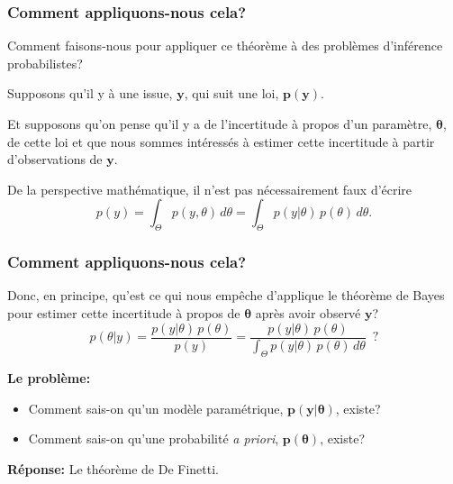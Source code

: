 \documentclass{beamer}
\begin{document}
\begin{frame}
    \frametitle{Comment appliquons-nous cela?}
    Comment faisons-nous pour appliquer ce théorème à des problèmes 
    d'inférence probabilistes?

    \pause

    \vfill

    Supposons qu'il y à une issue, $\boldsymbol{y}$, qui suit une loi, $\boldsymbol{p(y)}$.

    \pause

    \vfill

    Et supposons qu'on pense qu'il y a de l'incertitude à propos d'un paramètre, $\boldsymbol{\theta}$,
    de cette loi et que nous sommes intéressés à estimer cette incertitude à partir d'observations de $\boldsymbol{y}$.

    \pause

    \vfill
    
    De la perspective mathématique, il n'est pas nécessairement faux d'écrire
    \[p(y) = \int_{\Theta} p(y, \theta) \, d\theta = \int_{\Theta} p(y | \theta) \, p(\theta) \, d\theta.\]

\end{frame}


\begin{frame}
    \frametitle{Comment appliquons-nous cela?}
    Donc, en principe, qu'est ce qui nous empêche d'applique le théorème de Bayes
    pour estimer cette incertitude à propos de $\boldsymbol{\theta}$ après avoir
    observé $\boldsymbol{y}$?
    \[p(\theta | y) = \frac{p(y | \theta) \, p(\theta)}{p(y)} =
      \frac{p(y | \theta) \, p(\theta)}{\int_{\Theta} p(y | \theta) \, p(\theta) \, d\theta} \, \, \, \textrm{?}\]
    
    \pause

    \vfill

    \textbf{Le problème:}
    \begin{itemize}
      \item Comment sais-on qu'un modèle paramétrique, $\boldsymbol{p(y | \theta)}$, existe?
      \pause
      \item Comment sais-on qu'une probabilité \emph{a priori}, $\boldsymbol{p(\theta)}$, existe?
    \end{itemize}

    \vfill

    \pause

    \textbf{Réponse:} Le théorème de De Finetti.
\end{frame}
\end{document}
